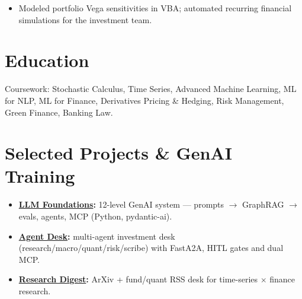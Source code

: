 \documentclass[10.3pt]{article}
\begin{document}
\vspace{2pt}
\begin{itemize}
  \item Modeled portfolio Vega sensitivities in VBA; automated recurring financial simulations for the investment team.
\end{itemize}

\section*{Education}

Coursework: Stochastic Calculus, Time Series, Advanced Machine Learning, ML for NLP, ML for Finance, Derivatives Pricing \& Hedging, Risk Management, Green Finance, Banking Law.
\vspace{2pt}

\vspace{2pt}


\section*{Selected Projects \& GenAI Training}
\begin{itemize}
  \item \textbf{\href{https://lab.annamosaki.com/demos/llm-lab}{LLM Foundations}:} 12-level GenAI system --- prompts \(\rightarrow\) GraphRAG \(\rightarrow\) evals, agents, MCP (Python, pydantic-ai).
  \item \textbf{\href{https://desk.annamosaki.com/demos/agent-desk}{Agent Desk}:} multi-agent investment desk (research/macro/quant/risk/scribe) with FastA2A, HITL gates and dual MCP.
  \item \textbf{\href{https://digest.annamosaki.com/demos/research-digest}{Research Digest}:} ArXiv + fund/quant RSS desk for time-series \(\times\) finance research.
\end{itemize}
\end{document}

